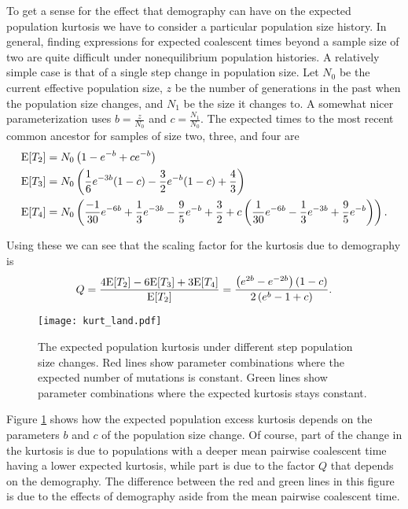 To get a sense for the effect that demography can have on the expected
population kurtosis we have to consider a particular population size history. In
general, finding expressions for expected coalescent times beyond a sample size
of two are quite difficult under nonequilibrium population histories. A
relatively simple case is that of a single step change in population size. Let
$N_0$ be the current effective population size, $z$ be the number of generations
in the past when the population size changes, and $N_1$ be the size it changes
to. A somewhat nicer parameterization uses $b=\frac{z}{N_0}$ and
$c=\frac{N_1}{N_0}$. The expected times to the most recent common ancestor for
samples of size two, three, and four are
\begin{align}
  \mathrm{E}[T_2] &= N_0\left( 1-e^{-b} + ce^{-b} \right) \nonumber \\
  \mathrm{E}[T_3] &= N_0\left( \frac{1}{6} e^{-3b}(1-c) - \frac{3}{2}e^{-b}(1-c) + \frac{4}{3} \right) \nonumber \\
  \mathrm{E}[T_4] &= N_0\left( \frac{-1}{30}e^{-6b} + \frac{1}{3}e^{-3b} - \frac{9}{5}e^{-b} + \frac{3}{2}
  + c\left( \frac{1}{30}e^{-6b} - \frac{1}{3}e^{-3b} +\frac{9}{5}e^{-b} \right)\right). \nonumber \\
\end{align}

Using these we can see that the scaling factor for the kurtosis due to
demography is
\begin{equation}
  Q = \frac{ 4\mathrm{E}[T_2] - 6\mathrm{E}[T_3] + 3\mathrm{E}[T_4]}{\mathrm{E}[T_2]} =
    \frac{\left( e^{2b} - e^{-2b} \right)(1-c)}{2\left(e^{b} -1 + c\right)}.
\end{equation}
\begin{figure}
  \label{fig:kurtland}
  \centering
  \texttt{[image: kurt\_land.pdf]}
  \caption{The expected population kurtosis under different step population size
    changes. Red lines show parameter combinations where the expected number of
    mutations is constant. Green lines show parameter combinations where the
    expected kurtosis  stays constant.}
\end{figure}
Figure \ref{fig:kurtland} shows how the expected population excess kurtosis
depends on the parameters $b$ and $c$ of the population size change. Of course,
part of the change in the kurtosis is due to populations with a deeper mean
pairwise coalescent time having a lower expected kurtosis, while part is due to
the factor $Q$ that depends on the demography. The difference between the red
and green lines in this figure is due to the effects of demography aside from
the mean pairwise coalescent time. 

